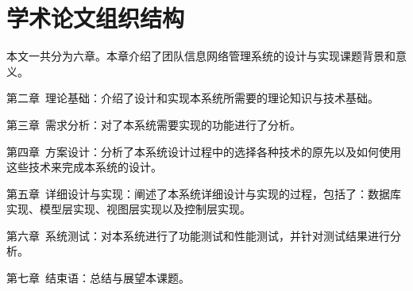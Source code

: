 \section{学术论文组织结构}

本文一共分为六章。本章介绍了团队信息网络管理系统的设计与实现课题背景和意义。

第二章~理论基础：介绍了设计和实现本系统所需要的理论知识与技术基础。

第三章~需求分析：对了本系统需要实现的功能进行了分析。

第四章~方案设计：分析了本系统设计过程中的选择各种技术的原先以及如何使用这些技术来完成本系统的设计。

第五章~详细设计与实现：阐述了本系统详细设计与实现的过程，包括了：数据库实现、模型层实现、视图层实现以及控制层实现。

第六章~系统测试：对本系统进行了功能测试和性能测试，并针对测试结果进行分析。

第七章~结束语：总结与展望本课题。